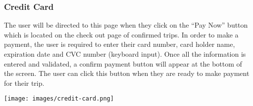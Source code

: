 \documentclass[hidelinks, 12pt, a4paper]{article}
\begin{document}
\subsubsection{Credit Card}
The user will be directed to this page when they click on the “Pay Now” button which is located on the check out page of confirmed trips. In order to make a payment, the user is required to enter their card number, card holder name, expiration date and CVC number (keyboard input). Once all the information is entered and validated, a confirm payment button will appear at the bottom of the screen. The user can click this button when they are ready to make payment for their trip.

\begin{center}
  \texttt{[image: images/credit-card.png]}
\end{center}
\vspace{1cm}
\end{document}
